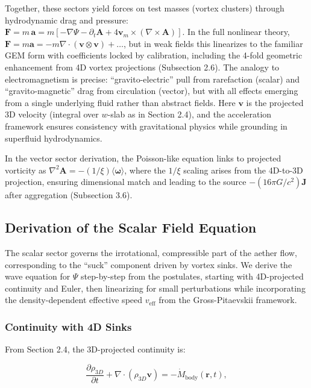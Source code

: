 Together, these sectors yield forces on test masses (vortex clusters) through hydrodynamic drag and pressure: $\mathbf{F} = m \, \mathbf{a} = m [ -\nabla \Psi - \partial_t \mathbf{A} + 4 \mathbf{v}_m \times (\nabla \times \mathbf{A}) ]$. In the full nonlinear theory, $\mathbf{F} = m \mathbf{a} = -m \nabla \cdot (\mathbf{v} \otimes \mathbf{v}) + \dots$, but in weak fields this linearizes to the familiar GEM form with coefficients locked by calibration, including the 4-fold geometric enhancement from 4D vortex projections (Subsection 2.6). The analogy to electromagnetism is precise: ``gravito-electric'' pull from rarefaction (scalar) and ``gravito-magnetic'' drag from circulation (vector), but with all effects emerging from a single underlying fluid rather than abstract fields. Here $\mathbf{v}$ is the projected 3D velocity (integral over $w$-slab as in Section 2.4), and the acceleration framework ensures consistency with gravitational physics while grounding in superfluid hydrodynamics.

In the vector sector derivation, the Poisson-like equation links to projected vorticity as $\nabla^2 \mathbf{A} = - (1/\xi) \langle \boldsymbol{\omega} \rangle$, where the $1/\xi$ scaling arises from the 4D-to-3D projection, ensuring dimensional match and leading to the source $-(16\pi G / c^2) \mathbf{J}$ after aggregation (Subsection 3.6).

\subsection{Derivation of the Scalar Field Equation}

The scalar sector governs the irrotational, compressible part of the aether flow, corresponding to the ``suck'' component driven by vortex sinks. We derive the wave equation for $\Psi$ step-by-step from the postulates, starting with 4D-projected continuity and Euler, then linearizing for small perturbations while incorporating the density-dependent effective speed $v_{\text{eff}}$ from the Gross-Pitaevskii framework.

\subsubsection{Continuity with 4D Sinks}

From Section 2.4, the 3D-projected continuity is:

\[
\frac{\partial \rho_{3D}}{\partial t} + \nabla \cdot (\rho_{3D} \mathbf{v}) = -\dot{M}_{\text{body}}(\mathbf{r}, t),
\]

